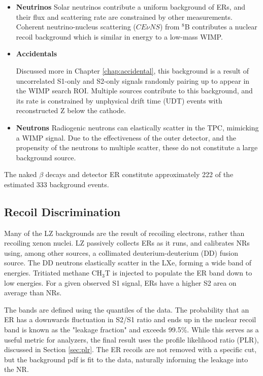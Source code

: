 \begin{itemize}
    \item \textbf{Neutrinos}
    Solar neutrinos contribute a uniform background of ERs, and their flux and scattering rate are constrained by other measurements.
    Coherent neutrino-nucleus scattering ($CE\nu NS$) from $^8$B contributes a nuclear recoil background which is similar in energy to a low-mass WIMP.
    
    \item \textbf{Accidentals}
    
    Discussed more in Chapter \ref{chap:accidental}, this background is a result of uncorrelated S1-only and S2-only signals randomly pairing up to appear in the WIMP search ROI.
    Multiple sources contribute to this background, and its rate is constrained by unphysical drift time (UDT) events with reconstructed Z below the cathode.
    
    \item \textbf{Neutrons}
    Radiogenic neutrons can elastically scatter in the TPC, mimicking a WIMP signal.
    Due to the effectiveness of the outer detector, and the propensity of the neutrons to multiple scatter, these do not constitute a large background source. 
\end{itemize}

The naked $\beta$ decays and detector ER constitute approximately 222 of the estimated 333 background events.

\subsection{Recoil Discrimination}
Many of the LZ backgrounds are the result of recoiling electrons, rather than recoiling xenon nuclei.
LZ passively collects ERs as it runs, and calibrates NRs using, among other sources, a collimated  deuterium-deuterium (DD) fusion source.
The DD neutrons elastically scatter in the LXe, forming a wide band of energies.
Tritiated methane CH$_3$T is injected to populate the ER band down to low energies.
For a given observed S1 signal, ERs have a higher S2 area on average than NRs.

The bands are defined using the quantiles of the data.
The probability that an ER has a downwards fluctuation in S2/S1 ratio and ends up in the nuclear recoil band is known as the "leakage fraction" and exceeds 99.5\%. 
While this serves as a useful metric for analyzers, the final result uses the profile likelihood ratio (PLR), discussed in Section \ref{sec:plr}.
The ER recoils are not removed with a specific cut, but the background pdf is fit to the data, naturally informing the leakage into the NR.

